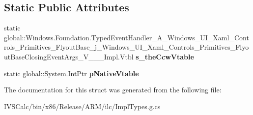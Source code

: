 \subsection*{Static Public Attributes}
\begin{DoxyCompactItemize}
\item 
\mbox{\label{struct_windows_1_1_foundation_1_1_typed_event_handler___a___windows___u_i___xaml___controls___pr37c6ff56f5f57bf809643c4cf92c5f10_a1b7bc807c3289ffe16e17a1c50888e15}} 
static global\+::\+Windows.\+Foundation.\+Typed\+Event\+Handler\+\_\+\+A\+\_\+\+Windows\+\_\+\+U\+I\+\_\+\+Xaml\+\_\+\+Controls\+\_\+\+Primitives\+\_\+\+Flyout\+Base\+\_\+j\+\_\+\+Windows\+\_\+\+U\+I\+\_\+\+Xaml\+\_\+\+Controls\+\_\+\+Primitives\+\_\+\+Flyout\+Base\+Closing\+Event\+Args\+\_\+\+V\+\_\+\+\_\+\+\_\+\+Impl.\+Vtbl {\bfseries s\+\_\+the\+Ccw\+Vtable}
\item 
\mbox{\label{struct_windows_1_1_foundation_1_1_typed_event_handler___a___windows___u_i___xaml___controls___pr37c6ff56f5f57bf809643c4cf92c5f10_aaab8fa1a6174a5c83db873c104c3e53e}} 
static global\+::\+System.\+Int\+Ptr {\bfseries p\+Native\+Vtable}
\end{DoxyCompactItemize}


The documentation for this struct was generated from the following file\+:\begin{DoxyCompactItemize}
\item 
I\+V\+S\+Calc/bin/x86/\+Release/\+A\+R\+M/ilc/Impl\+Types.\+g.\+cs\end{DoxyCompactItemize}
